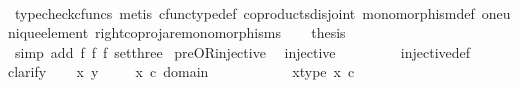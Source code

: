 \begin{isabellebody}
\ \ \ \ \isamarkupfalse%
\ {\isacharparenleft}{\kern0pt}typecheck{\isacharunderscore}{\kern0pt}cfuncs{\isacharcomma}{\kern0pt}\ metis\ cfunc{\isacharunderscore}{\kern0pt}type{\isacharunderscore}{\kern0pt}def\ coproducts{\isacharunderscore}{\kern0pt}disjoint\ monomorphism{\isacharunderscore}{\kern0pt}def\ one{\isacharunderscore}{\kern0pt}unique{\isacharunderscore}{\kern0pt}element\ right{\isacharunderscore}{\kern0pt}coproj{\isacharunderscore}{\kern0pt}are{\isacharunderscore}{\kern0pt}monomorphisms{\isacharparenright}{\kern0pt}\isanewline
\ \ \isamarkupfalse%
\ {\isacharquery}{\kern0pt}thesis\isanewline
\ \ \ \ \isamarkupfalse%
\ {\isacharparenleft}{\kern0pt}simp\ add{\isacharcolon}{\kern0pt}\ f{}\ f{}\ f{}\ set{\isacharunderscore}{\kern0pt}three{\isacharparenright}{\kern0pt}\isanewline
{}\isamarkupfalse%
%
\endisatagproof
{\isafoldproof}%
%
\isadelimproof
\isanewline
%
\endisadelimproof
\isanewline
{}\isamarkupfalse%
\ pre{\isacharunderscore}{\kern0pt}OR{\isacharunderscore}{\kern0pt}injective{\isacharcolon}{\kern0pt}\isanewline
\ \ {\isachardoublequoteopen}injective{\isacharparenleft}{\kern0pt}{\isasymlangle}{\isasymt}{\isacharcomma}{\kern0pt}\ {\isasymt}{\isasymrangle}{\isasymamalg}\ {\isacharparenleft}{\kern0pt}{\isasymlangle}{\isasymt}{\isacharcomma}{\kern0pt}\ {\isasymf}{\isasymrangle}\ {\isasymamalg}{\isasymlangle}{\isasymf}{\isacharcomma}{\kern0pt}\ {\isasymt}{\isasymrangle}{\isacharparenright}{\kern0pt}{\isacharparenright}{\kern0pt}{\isachardoublequoteclose}\isanewline
%
\isadelimproof
\ \ %
\endisadelimproof
%
\isatagproof
{}\isamarkupfalse%
\ injective{\isacharunderscore}{\kern0pt}def\isanewline
{}\isamarkupfalse%
{\isacharparenleft}{\kern0pt}clarify{\isacharparenright}{\kern0pt}\isanewline
\ \ \isamarkupfalse%
\ x\ y\ \isanewline
\ \ \isamarkupfalse%
\ {\isachardoublequoteopen}x\ {\isasymin}\isactrlsub c\ domain\ {\isacharparenleft}{\kern0pt}{\isasymlangle}{\isasymt}{\isacharcomma}{\kern0pt}{\isasymt}{\isasymrangle}\ {\isasymamalg}\ {\isasymlangle}{\isasymt}{\isacharcomma}{\kern0pt}{\isasymf}{\isasymrangle}\ {\isasymamalg}\ {\isasymlangle}{\isasymf}{\isacharcomma}{\kern0pt}{\isasymt}{\isasymrangle}{\isacharparenright}{\kern0pt}{\isachardoublequoteclose}\ \isanewline
\ \ \isamarkupfalse%
\ \isamarkupfalse%
\ x{\isacharunderscore}{\kern0pt}type{\isacharcolon}{\kern0pt}\ {\isachardoublequoteopen}x\ {\isasymin}\isactrlsub c\ {\isacharparenleft}{\kern0pt}{\isasymone}{\isasymCoprod}{\isacharparenleft}{\kern0pt}{\isasymone}{\isasymCoprod}{\isasymone}{\isacharparenright}{\kern0pt}{\isacharparenright}{\kern0pt}{\isachardoublequoteclose}\ \ \isanewline

\end{isabellebody}

